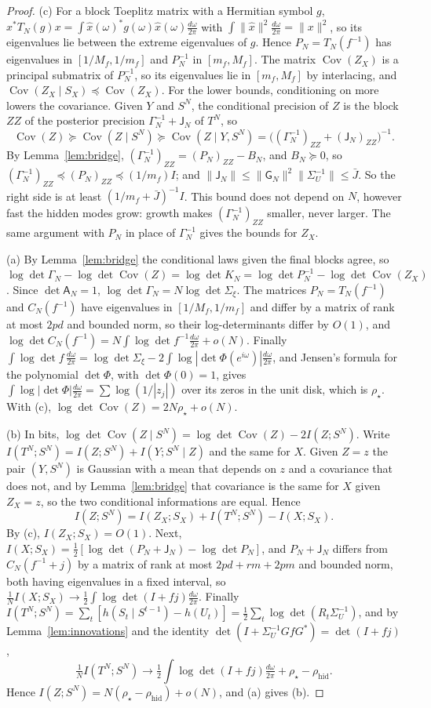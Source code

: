 \documentclass[11pt,onecolumn]{IEEEtran}
\newcommand{\Cov}{\operatorname{Cov}}
\newcommand{\dw}{\tfrac{d\omega}{2\pi}}
\newcommand{\rhid}{\rho_{\mathrm{hid}}}
\begin{document}
\begin{proof}
(c) For a block Toeplitz matrix with a Hermitian symbol $g$,
$x^*T_N(g)x=\int\hat x(\omega)^*g(\omega)\hat x(\omega)\dw$ with
$\int\|\hat x\|^2\dw=\|x\|^2$, so its eigenvalues lie between the extreme
eigenvalues of $g$. Hence $P_N=T_N(f^{-1})$ has eigenvalues in
$[1/M_f,1/m_f]$ and $P_N^{-1}$ in $[m_f,M_f]$. The matrix $\Cov(Z_X)$ is
a principal submatrix of $P_N^{-1}$, so its eigenvalues lie in
$[m_f,M_f]$ by interlacing, and $\Cov(Z_X\mid S_X)\preceq\Cov(Z_X)$.
For the lower bounds, conditioning on more lowers the covariance.
Given $Y$ and $S^N$, the conditional precision of $Z$ is the block $ZZ$
of the posterior precision $\Gamma_N^{-1}+\mathsf J_N$ of $T^N$, so
\[
\Cov(Z)\succeq\Cov(Z\mid S^N)\succeq\Cov(Z\mid Y,S^N)=\bigl((\Gamma_N^{-1})_{ZZ}+(\mathsf J_N)_{ZZ}\bigr)^{-1}.
\]
By Lemma~\ref{lem:bridge}, $(\Gamma_N^{-1})_{ZZ}=(P_N)_{ZZ}-B_N$, and
$B_N\succeq0$, so $(\Gamma_N^{-1})_{ZZ}\preceq(P_N)_{ZZ}\preceq(1/m_f)I$;
and $\|\mathsf J_N\|\le\|\mathsf G_N\|^2\|\Sigma_U^{-1}\|\le\bar J$. So
the right side is at least $(1/m_f+\bar J)^{-1}I$. This bound does not
depend on $N$, however fast the hidden modes grow: growth makes
$(\Gamma_N^{-1})_{ZZ}$ smaller, never larger. The same argument with
$P_N$ in place of $\Gamma_N^{-1}$ gives the bounds for $Z_X$.

(a) By Lemma~\ref{lem:bridge} the conditional laws given the final
blocks agree, so
$\log\det\Gamma_N-\log\det\Cov(Z)=\log\det K_N=\log\det P_N^{-1}-\log\det\Cov(Z_X)$.
Since $\det\mathsf A_N=1$, $\log\det\Gamma_N=N\log\det\Sigma_\xi$. The
matrices $P_N=T_N(f^{-1})$ and $C_N(f^{-1})$ have eigenvalues in
$[1/M_f,1/m_f]$ and differ by a matrix of rank at most $2pd$ and bounded
norm, so their log-determinants differ by $O(1)$, and
$\log\det C_N(f^{-1})=N\int\log\det f^{-1}\dw+o(N)$. Finally
$\int\log\det f\,\dw=\log\det\Sigma_\xi-2\int\log|\det\Phi(e^{i\omega})|\dw$,
and Jensen's formula for the polynomial $\det\Phi$, with
$\det\Phi(0)=1$, gives $\int\log|\det\Phi|\dw=\sum\log(1/|z_j|)$ over its
zeros in the unit disk, which is $\rho_\star$. With (c),
$\log\det\Cov(Z)=2N\rho_\star+o(N)$.

(b) In bits,
$\log\det\Cov(Z\mid S^N)=\log\det\Cov(Z)-2I(Z;S^N)$. Write
$I(T^N;S^N)=I(Z;S^N)+I(Y;S^N\mid Z)$ and the same for $X$. Given $Z=z$
the pair $(Y,S^N)$ is Gaussian with a mean that depends on $z$ and a
covariance that does not, and by Lemma~\ref{lem:bridge} that covariance
is the same for $X$ given $Z_X=z$, so the two conditional informations
are equal. Hence
\[
I(Z;S^N)=I(Z_X;S_X)+I(T^N;S^N)-I(X;S_X).
\]
By (c), $I(Z_X;S_X)=O(1)$. Next,
$I(X;S_X)=\tfrac12[\log\det(P_N+\mathsf J_N)-\log\det P_N]$, and
$P_N+\mathsf J_N$ differs from $C_N(f^{-1}+j)$ by a matrix of rank at
most $2pd+rm+2pm$ and bounded norm, both having eigenvalues in a fixed
interval, so
$\tfrac1NI(X;S_X)\to\tfrac12\int\log\det(I+fj)\dw$. Finally
$I(T^N;S^N)=\sum_t[h(S_t\mid S^{t-1})-h(U_t)]=\tfrac12\sum_t\log\det(R_t\Sigma_U^{-1})$,
and by Lemma~\ref{lem:innovations} and the identity
$\det(I+\Sigma_U^{-1}GfG^*)=\det(I+fj)$,
\[
\tfrac1NI(T^N;S^N)\to\tfrac12\int\log\det(I+fj)\dw+\rho_\star-\rhid.
\]
Hence $I(Z;S^N)=N(\rho_\star-\rhid)+o(N)$, and (a) gives (b).
\end{proof}
\end{document}
